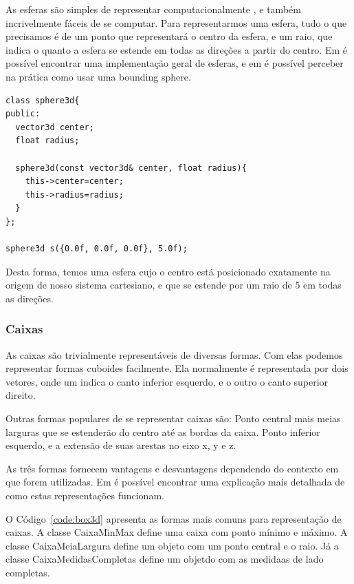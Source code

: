 As esferas são simples de representar computacionalmente , e também
incrivelmente fáceis de se computar. Para representarmos uma esfera, tudo o que
precisamos é de um ponto que representará o centro da esfera, e um raio, que
indica o quanto a esfera se estende em todas as direções a partir do centro.
Em  é possível encontrar uma implementação geral de esferas, e em  é possível perceber na prática como usar uma bounding sphere.

\begin{lstlisting}[frame=single,caption=Representação de esfera\label{code:sphere3d}]
class sphere3d{
public:
  vector3d center;
  float radius;
  
  sphere3d(const vector3d& center, float radius){
    this->center=center;
    this->radius=radius;
  }
};

sphere3d s({0.0f, 0.0f, 0.0f}, 5.0f);

\end{lstlisting}

Desta forma, temos uma esfera cujo o centro está posicionado exatamente na origem de
nosso sistema cartesiano, e que se estende por um raio de 5 em todas as
direções.

\subsubsection{Caixas}

As caixas são trivialmente representáveis de diversas formas. Com elas podemos
representar formas cuboides facilmente. Ela normalmente é representada por dois
vetores, onde um indica o canto inferior esquerdo, e o outro o canto superior direito.

Outras formas populares de se representar caixas são:
Ponto central mais meias larguras que se estenderão do centro até as bordas da caixa.
Ponto inferior esquerdo, e a extensão de suas arestas no eixo x, y e z.

As três formas fornecem vantagens e desvantagens dependendo do contexto em que forem utilizadas. Em  é possível encontrar uma explicação mais detalhada de como estas representações funcionam.


O Código~\ref{code:box3d} apresenta as formas mais comuns para representação de caixas. A classe CaixaMinMax define uma caixa com ponto mínimo e máximo. A classe CaixaMeiaLargura define um objeto com um ponto central e o raio. Já a classe CaixaMedidasCompletas define um objetdo com as medidaas de lado completas.

